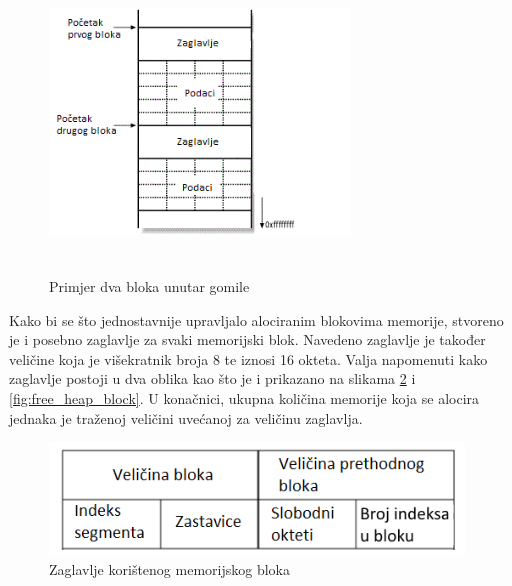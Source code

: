 \documentclass[times, utf8, diplomski, numeric]{fer}
\begin{document}
\begin{figure}[!ht]
\centering
\setlength\fboxsep{0pt}
\setlength\fboxrule{0.5pt}
\includegraphics[width=8cm, height=8cm]{slike/heap_2_allocated_blocks}
\caption{Primjer dva bloka unutar gomile}
\label{fig:heap_2_allocated_blocks} 
\end{figure}

Kako bi se što jednostavnije upravljalo alociranim blokovima
memorije, stvoreno je i posebno zaglavlje za svaki memorijski
blok. Navedeno zaglavlje je također veličine koja je višekratnik
broja 8 te iznosi 16 okteta. Valja napomenuti kako zaglavlje
postoji u dva oblika kao što je i prikazano na slikama 
\ref{fig:used_heap_block} i \ref{fig:free_heap_block}. U
konačnici, ukupna količina memorije koja se alocira jednaka je
traženoj veličini uvećanoj za veličinu zaglavlja.				%


\begin{figure}[!ht]
\centering
\setlength\fboxsep{0pt}
\setlength\fboxrule{0.5pt}
\includegraphics[width=11cm, height=3cm]{slike/used_heap_block}
\caption{Zaglavlje korištenog memorijskog bloka}
\label{fig:used_heap_block} 
\end{figure}
\end{document}
